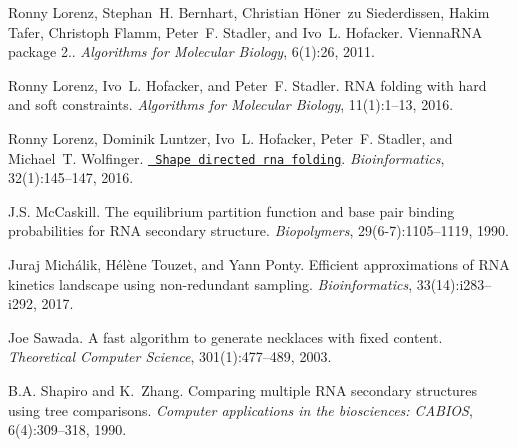\begin{DoxyDescription}
\item[\label{citelist_CITEREF_lorenz:2011}%
\Hypertarget{citelist_CITEREF_lorenz:2011}%
\mbox{[}15\mbox{]}]Ronny Lorenz, Stephan~H. Bernhart, Christian H\"{o}ner~zu Siederdissen, Hakim Tafer, Christoph Flamm, Peter~F. Stadler, and Ivo~L. Hofacker. Vienna\+RNA package 2.. {\itshape Algorithms for Molecular Biology}, 6(1)\+:26, 2011. 


\item[\label{citelist_CITEREF_lorenz:2016b}%
\Hypertarget{citelist_CITEREF_lorenz:2016b}%
\mbox{[}16\mbox{]}]Ronny Lorenz, Ivo~L. Hofacker, and Peter~F. Stadler. RNA folding with hard and soft constraints. {\itshape Algorithms for Molecular Biology}, 11(1)\+:1--13, 2016. 


\item[\label{citelist_CITEREF_lorenz:2016a}%
\Hypertarget{citelist_CITEREF_lorenz:2016a}%
\mbox{[}17\mbox{]}]Ronny Lorenz, Dominik Luntzer, Ivo~L. Hofacker, Peter~F. Stadler, and Michael~T. Wolfinger. \href{http://bioinformatics.oxfordjournals.org/content/32/1/145.abstract}{\texttt{ Shape directed rna folding}}. {\itshape Bioinformatics}, 32(1)\+:145--147, 2016. 


\item[\label{citelist_CITEREF_mccaskill:1990}%
\Hypertarget{citelist_CITEREF_mccaskill:1990}%
\mbox{[}18\mbox{]}]J.\+S. Mc\+Caskill. The equilibrium partition function and base pair binding probabilities for RNA secondary structure. {\itshape Biopolymers}, 29(6-\/7)\+:1105--1119, 1990.


\item[\label{citelist_CITEREF_michalik:2017}%
\Hypertarget{citelist_CITEREF_michalik:2017}%
\mbox{[}19\mbox{]}]Juraj Mich\'{a}lik, H\'{e}l\`{e}ne Touzet, and Yann Ponty. Efficient approximations of RNA kinetics landscape using non-\/redundant sampling. {\itshape Bioinformatics}, 33(14)\+:i283--i292, 2017.


\item[\label{citelist_CITEREF_sawada:2003}%
\Hypertarget{citelist_CITEREF_sawada:2003}%
\mbox{[}20\mbox{]}]Joe Sawada. A fast algorithm to generate necklaces with fixed content. {\itshape Theoretical Computer Science}, 301(1)\+:477--489, 2003.


\item[\label{citelist_CITEREF_shapiro:1990}%
\Hypertarget{citelist_CITEREF_shapiro:1990}%
\mbox{[}21\mbox{]}]B.\+A. Shapiro and K.~Zhang. Comparing multiple RNA secondary structures using tree comparisons. {\itshape Computer applications in the biosciences\+: CABIOS}, 6(4)\+:309--318, 1990.



\end{DoxyDescription}

